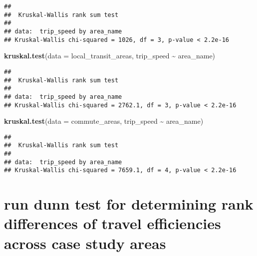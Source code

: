 \documentclass[
]{article}
\newenvironment{Shaded}{\begin{snugshade}}{\end{snugshade}}
\newcommand{\AttributeTok}[1]{\textcolor[rgb]{0.13,0.29,0.53}{#1}}
\newcommand{\FunctionTok}[1]{\textcolor[rgb]{0.13,0.29,0.53}{\textbf{#1}}}
\newcommand{\NormalTok}[1]{#1}
\newcommand{\SpecialCharTok}[1]{\textcolor[rgb]{0.81,0.36,0.00}{\textbf{#1}}}
\begin{document}
\begin{verbatim}
## 
##  Kruskal-Wallis rank sum test
## 
## data:  trip_speed by area_name
## Kruskal-Wallis chi-squared = 1026, df = 3, p-value < 2.2e-16
\end{verbatim}

\begin{Shaded}
\begin{Highlighting}[]
\FunctionTok{kruskal.test}\NormalTok{(}\AttributeTok{data =}\NormalTok{ local\_transit\_areas, trip\_speed }\SpecialCharTok{\textasciitilde{}}\NormalTok{ area\_name)}
\end{Highlighting}
\end{Shaded}

\begin{verbatim}
## 
##  Kruskal-Wallis rank sum test
## 
## data:  trip_speed by area_name
## Kruskal-Wallis chi-squared = 2762.1, df = 3, p-value < 2.2e-16
\end{verbatim}

\begin{Shaded}
\begin{Highlighting}[]
\FunctionTok{kruskal.test}\NormalTok{(}\AttributeTok{data =}\NormalTok{ commute\_areas, trip\_speed }\SpecialCharTok{\textasciitilde{}}\NormalTok{ area\_name)}
\end{Highlighting}
\end{Shaded}

\begin{verbatim}
## 
##  Kruskal-Wallis rank sum test
## 
## data:  trip_speed by area_name
## Kruskal-Wallis chi-squared = 7659.1, df = 4, p-value < 2.2e-16
\end{verbatim}

\section{run dunn test for determining rank differences of travel
efficiencies across case study
areas}\label{run-dunn-test-for-determining-rank-differences-of-travel-efficiencies-across-case-study-areas}

\begin{Shaded}
\end{Shaded}
\end{document}
